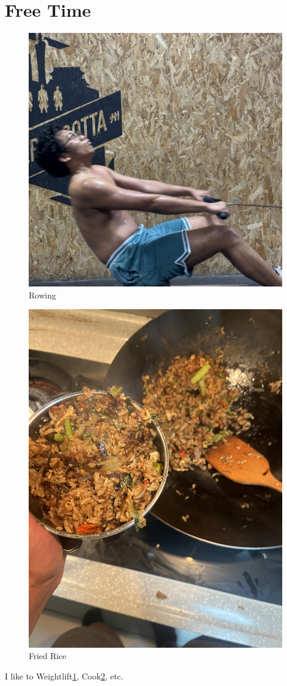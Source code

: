 \documentclass{article}
\begin{document}
\section{Free Time}
\begin{figure}
    \centering
    \includegraphics[width=0.5\linewidth]{IMG_3086.jpeg}
    \caption{Rowing}
    \label{fig:weightlift}
\end{figure}
\begin{figure}
    \centering
    \includegraphics[width=0.5\linewidth]{IMG_2491.jpeg}
    \caption{Fried Rice}
    \label{fig:cooking}
\end{figure}
I like to Weightlift\ref{fig:weightlift}, Cook\ref{fig:cooking}, etc.
\newpage
\end{document}
